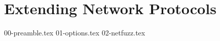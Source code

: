 \chapter{Extending Network Protocols}
\label{extend:chapter}

{00-preamble.tex}
{01-options.tex}
{02-netfuzz.tex}

